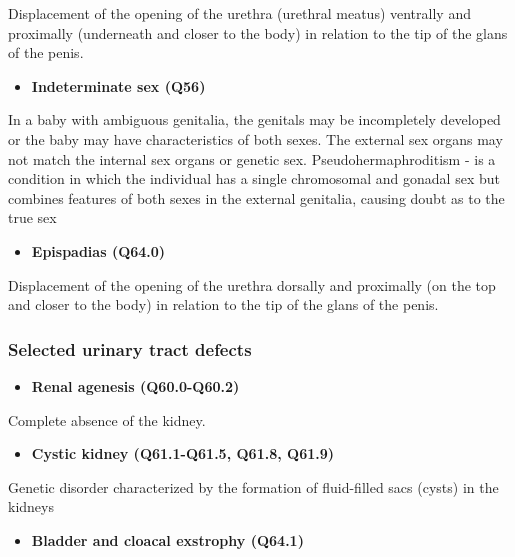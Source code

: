 \documentclass[
]{krantz}
\providecommand{\tightlist}{%
  \setlength{\itemsep}{0pt}\setlength{\parskip}{0pt}}
\begin{document}
Displacement of the opening of the urethra (urethral meatus) ventrally and proximally (underneath and closer to the body) in relation to the tip of the glans of the penis.

\begin{itemize}
\tightlist
\item
  \textbf{Indeterminate sex (Q56)}
\end{itemize}

In a baby with ambiguous genitalia, the genitals may be incompletely developed or the baby may have characteristics of both sexes. The external sex organs may not match the internal sex organs or genetic sex. Pseudohermaphroditism - is a condition in which the individual has a single chromosomal and gonadal sex but combines features of both sexes in the external genitalia, causing doubt as to the true sex

\begin{itemize}
\tightlist
\item
  \textbf{Epispadias (Q64.0)}
\end{itemize}

Displacement of the opening of the urethra dorsally and proximally (on the top and closer to the body) in relation to the tip of the glans of the penis.

\hypertarget{section2118}{%
\subsubsection{Selected urinary tract defects}\label{section2118}}

\begin{itemize}
\tightlist
\item
  \textbf{Renal agenesis (Q60.0-Q60.2)}
\end{itemize}

Complete absence of the kidney.

\begin{itemize}
\tightlist
\item
  \textbf{Cystic kidney (Q61.1-Q61.5, Q61.8, Q61.9)}
\end{itemize}

Genetic disorder characterized by the formation of fluid-filled sacs (cysts) in the kidneys

\begin{itemize}
\tightlist
\item
  \textbf{Bladder and cloacal exstrophy (Q64.1)}
\end{itemize}
\end{document}
